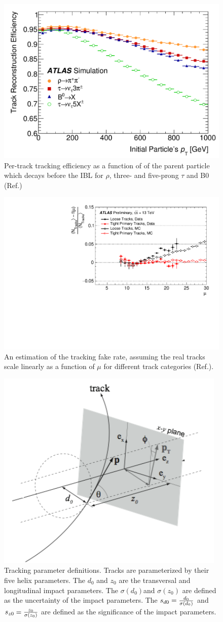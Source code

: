 \begin{figure}[htpb!]
\begin{center}
  \includegraphics[width=0.55\linewidth]{figures/Reco/TrackingEfficiency}
  \caption{Per-track tracking efficiency as a function of \pt of the parent particle which decays before the IBL for $\rho$, three- and five-prong $\tau$ and B0 (Ref.\cite{Aaboud:2017all})}
\label{fig:reco-trackingeff}
\end{center}
\end{figure}

\begin{figure}[htpb!]
\begin{center}
  \includegraphics[width=0.55\linewidth]{figures/Reco/TrackingFake}
\caption{An estimation of the tracking fake rate, assuming the real tracks scale linearly as a function of $\mu$ for different track categories (Ref.\cite{ATL-PHYS-PUB-2015-051}). }
\label{fig:reco-trackingfake}
\end{center}
\end{figure}

\begin{figure}[htpb!]
\begin{center}
  \includegraphics[width=0.4\linewidth]{figures/Reco/trackpar.png}
\caption{Tracking parameter definitions. Tracks are parameterized by their five helix parameters. The $d_0$ and $z_0$ are the transversal and longitudinal impact parameters. The $\sigma(d_0)$and $\sigma(z_0)$ are defined as the uncertainty of the impact parameters. The $s_{d0}=\frac{d_0}{\sigma(d_0)}$ and $s_{z0}=\frac{z_0}{\sigma(z_0)}$ are defined as the significance of the impact parameters.}
\label{fig:reco-trkdef}
\end{center}
\end{figure}


